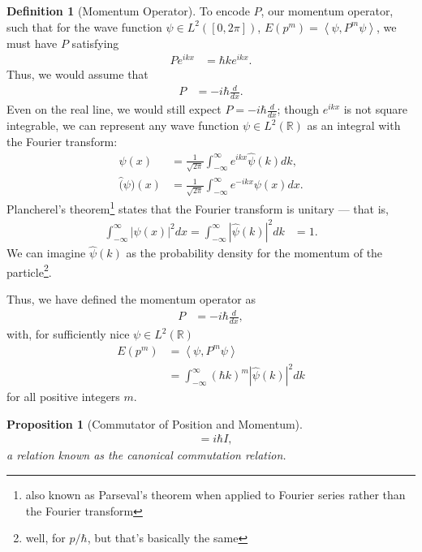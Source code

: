 \documentclass[12pt]{extarticle}
\newcommand{\R}{\mathbb{R}}
\newcommand{\iprod}[2]{\left\langle #1,#2\right\rangle}
\theoremstyle{plain}
\newtheorem*{proposition}{Proposition}%
\theoremstyle{definition}
\newtheorem*{definition}{Definition}
\theoremstyle{remark}
\renewcommand{\newline}{\hfill\break}
\begin{document}
  \begin{definition}[Momentum Operator]
    To encode $P$, our momentum operator, such that for the wave function $\psi\in L^{2}([0,2\pi])$, $E(p^m) = \iprod{\psi}{P^{m}\psi}$, we must have $P$ satisfying
    \begin{align*}
      Pe^{ikx} &= \hbar k e^{ikx}.
    \end{align*}
    Thus, we would assume that
    \begin{align*}
      P &= -i\hbar \frac{d}{dx}.
    \end{align*}
    Even on the real line, we would still expect $P = -i\hbar \frac{d}{dx}$; though $e^{ikx}$ is not square integrable, we can represent any wave function $\psi \in L^{2}(\R)$ as an integral with the Fourier transform:
    \begin{align*}
      \psi(x) &= \frac{1}{\sqrt{2\pi}}\int_{-\infty}^{\infty}e^{ikx}\hat{\psi}(k)dk,\\
      \hat(\psi)(x) &= \frac{1}{\sqrt{2\pi}}\int_{-\infty}^{\infty}e^{-ikx}\psi(x)dx.
    \end{align*}
    Plancherel's theorem\footnote{also known as Parseval's theorem when applied to Fourier series rather than the Fourier transform} states that the Fourier transform is unitary --- that is,
    \begin{align*}
      \int_{-\infty}^{\infty}|\psi(x)|^2dx = \int_{-\infty}^{\infty}\left\vert \hat{\psi}(k) \right\vert^2dk &= 1.
    \end{align*}
    We can imagine $\hat{\psi}(k)$ as the probability density for the momentum of the particle\footnote{well, for $p/\hbar$, but that's basically the same}.\newline

    Thus, we have defined the momentum operator as
    \begin{align*}
      P &= -i\hbar \frac{d}{dx},
    \end{align*}
    with, for sufficiently nice $\psi\in L^{2}(\R)$
    \begin{align*}
      E(p^{m}) &= \iprod{\psi}{P^{m}\psi}\\
               &= \int_{-\infty}^{\infty}(\hbar k)^m \left\vert \hat{\psi}(k) \right\vert^2 dk
    \end{align*}
    for all positive integers $m$.
  \end{definition}
  \begin{proposition}[Commutator of Position and Momentum]
    \begin{align*}
      [X,P] &= i\hbar I,
    \end{align*}
    a relation known as the canonical commutation relation.
  \end{proposition}
\end{document}
